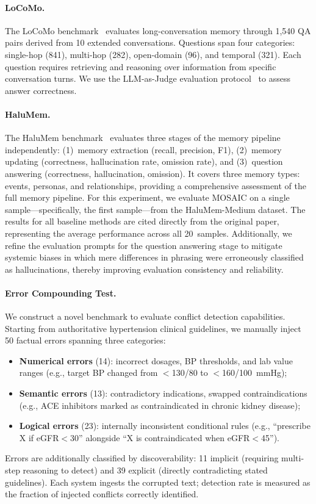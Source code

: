 \documentclass[10pt,twocolumn]{article}
\begin{document}
\paragraph{LoCoMo.}
The LoCoMo benchmark~\citep{maharana2024evaluating} evaluates long-conversation memory
through 1,540 QA pairs derived from 10 extended conversations. Questions
span four categories: single-hop (841), multi-hop (282), open-domain (96),
and temporal (321). Each question requires retrieving and reasoning over
information from specific conversation turns. We use the LLM-as-Judge
evaluation protocol~\citep{zheng2023judging} to assess answer correctness.

\paragraph{HaluMem.}
The HaluMem benchmark~\citep{chen2025halumem} evaluates three stages of the
memory pipeline independently: (1)~memory extraction (recall, precision,
F1), (2)~memory updating (correctness, hallucination rate, omission rate),
and (3)~question answering (correctness, hallucination, omission). It
covers three memory types: events, personas, and relationships, providing
a comprehensive assessment of the full memory pipeline. For this experiment,
we evaluate MOSAIC on a single sample---specifically, the first sample---from
the HaluMem-Medium dataset. The results for all baseline methods are cited
directly from the original paper, representing the average performance
across all 20~samples. Additionally, we refine the evaluation prompts for
the question answering stage to mitigate systemic biases in which mere
differences in phrasing were erroneously classified as hallucinations,
thereby improving evaluation consistency and reliability.

\paragraph{Error Compounding Test.}
We construct a novel benchmark to evaluate conflict detection capabilities.
Starting from authoritative hypertension clinical guidelines, we manually
inject 50 factual errors spanning three categories:
\begin{itemize}[noitemsep,topsep=3pt]
  \item \textbf{Numerical errors} (14): incorrect dosages, BP thresholds,
    and lab value ranges (e.g., target BP changed from $<$130/80 to
    $<$160/100~mmHg);
  \item \textbf{Semantic errors} (13): contradictory indications, swapped
    contraindications (e.g., ACE inhibitors marked as contraindicated in
    chronic kidney disease);
  \item \textbf{Logical errors} (23): internally inconsistent conditional
    rules (e.g., ``prescribe X if eGFR$<$30'' alongside ``X is
    contraindicated when eGFR$<$45'').
\end{itemize}
Errors are additionally classified by discoverability: 11 implicit (requiring
multi-step reasoning to detect) and 39 explicit (directly contradicting
stated guidelines). Each system ingests the corrupted text; detection rate is
measured as the fraction of injected conflicts correctly identified.
\end{document}
